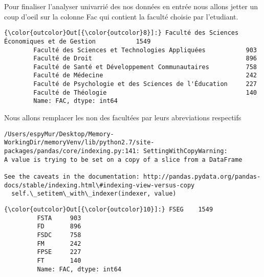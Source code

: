 \documentclass[11pt]{article}
\begin{document}
    Pour finaliser l'analyser univarrié des nos données en entrée nous
allons jetter un coup d'oeil sur la colonne Fac qui contient la faculté
choisie par l'etudiant.

            \begin{Verbatim}[commandchars=\\\{\}]
{\color{outcolor}Out[{\color{outcolor}8}]:} Faculté des Sciences Économiques et de Gestion           1549
        Faculté des Sciences et Technologies Appliquées           903
        Faculté de Droit                                          896
        Faculté de Santé et Développement Communautaires          758
        Faculté de Médecine                                       242
        Faculté de Psychologie et des Sciences de l'Éducation     227
        Faculté de Théologie                                      140
        Name: FAC, dtype: int64
\end{Verbatim}
        
    Nous allons remplacer les non des facultées par leurs abreviations
respectifs

    \begin{Verbatim}[commandchars=\\\{\}]
/Users/espyMur/Desktop/Memory-WorkingDir/memoryVenv/lib/python2.7/site-packages/pandas/core/indexing.py:141: SettingWithCopyWarning: 
A value is trying to be set on a copy of a slice from a DataFrame

See the caveats in the documentation: http://pandas.pydata.org/pandas-docs/stable/indexing.html\#indexing-view-versus-copy
  self.\_setitem\_with\_indexer(indexer, value)

    \end{Verbatim}

            \begin{Verbatim}[commandchars=\\\{\}]
{\color{outcolor}Out[{\color{outcolor}10}]:} FSEG    1549
         FSTA     903
         FD       896
         FSDC     758
         FM       242
         FPSE     227
         FT       140
         Name: FAC, dtype: int64
\end{Verbatim}
        
    \begin{center}
    \end{center}
    { \hspace*{\fill} \\}
    
\end{document}
